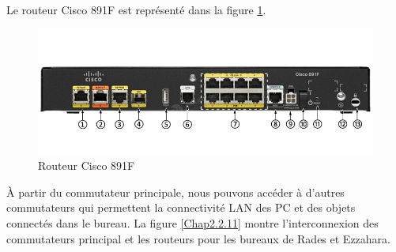 Le routeur Cisco 891F est représenté dans la figure \ref{Chap2.2.10}.

\begin{figure}[H]
\centering
\includegraphics[width=15cm]{Images/C891F_1.jpg}
\caption{Routeur Cisco 891F}
\label{Chap2.2.10}
\end{figure}

À partir du commutateur principale, nous pouvons accéder à d'autres commutateurs qui permettent la connectivité LAN des PC et des objets connectés dans le bureau. La figure \ref{Chap2.2.11} montre l'interconnexion des commutateurs principal et les routeurs pour les bureaux de Rades et Ezzahara.


